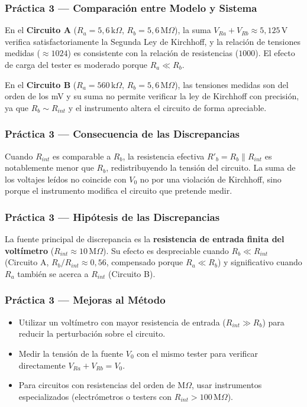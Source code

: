 \subsubsection{Práctica 3 --- Comparación entre Modelo y Sistema}
 
En el \textbf{Circuito A} ($R_a = 5{,}6\,\text{k}\Omega$, $R_b = 5{,}6\,\text{M}\Omega$),
la suma $V_{Ra} + V_{Rb} \approx 5{,}125\,\text{V}$ verifica satisfactoriamente
la Segunda Ley de Kirchhoff, y la relación de tensiones medidas
(${\approx}1024$) es consistente con la relación de resistencias ($1000$).
El efecto de carga del tester es moderado porque $R_a \ll R_b$.
 
En el \textbf{Circuito B} ($R_a = 560\,\text{k}\Omega$, $R_b = 5{,}6\,\text{M}\Omega$),
las tensiones medidas son del orden de los mV y su suma no permite
verificar la ley de Kirchhoff con precisión, ya que $R_b \sim R_{int}$
y el instrumento altera el circuito de forma apreciable.
 
\subsubsection{Práctica 3 --- Consecuencia de las Discrepancias}
 
Cuando $R_{int}$ es comparable a $R_b$, la resistencia efectiva
$R'_b = R_b \| R_{int}$ es notablemente menor que $R_b$, redistribuyendo
la tensión del circuito. La suma de los voltajes leídos no coincide con $V_0$
no por una violación de Kirchhoff, sino porque el instrumento modifica
el circuito que pretende medir.
 
\subsubsection{Práctica 3 --- Hipótesis de las Discrepancias}
 
La fuente principal de discrepancia es la \textbf{resistencia de entrada
finita del voltímetro} ($R_{int} \approx 10\,\text{M}\Omega$). Su efecto
es despreciable cuando $R_b \ll R_{int}$ (Circuito A, $R_b/R_{int} \approx 0{,}56$,
compensado porque $R_a \ll R_b$) y significativo cuando $R_a$ también
se acerca a $R_{int}$ (Circuito B).
 
\subsubsection{Práctica 3 --- Mejoras al Método}
 
\begin{itemize}
    \item Utilizar un voltímetro con mayor resistencia de entrada
    ($R_{int} \gg R_b$) para reducir la perturbación sobre el circuito.
    \item Medir la tensión de la fuente $V_0$ con el mismo tester para
    verificar directamente $V_{Ra} + V_{Rb} = V_0$.
    \item Para circuitos con resistencias del orden de M$\Omega$, usar
    instrumentos especializados (electrómetros o testers con
    $R_{int} > 100\,\text{M}\Omega$).
\end{itemize}
 